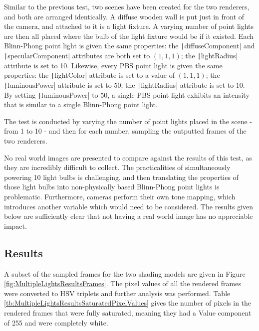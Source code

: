 Similar to the previous test, two scenes have been created for the two renderers, and both are arranged identically. A diffuse wooden wall is put just in front of the camera, and attached to it is a light fixture. A varying number of point lights are then all placed where the bulb of the light fixture would be if it existed. Each Blinn-Phong point light is given the same properties: the \texttt|diffuseComponent| and \texttt|specularComponent| attributes are both set to \begin{math}(1, 1, 1)\end{math}; the \texttt|lightRadius| attribute is set to 10. Likewise, every PBS point light is given the same properties: the \texttt|lightColor| attribute is set to a value of \begin{math}(1, 1, 1)\end{math}; the \texttt|luminousPower| attribute is set to 50; the \texttt|lightRadius| attribute is set to 10. By setting \texttt|luminousPower| to 50, a single PBS point light exhibits an intensity that is similar to a single Blinn-Phong point light.

The test is conducted by varying the number of point lights placed in the scene - from 1 to 10 - and then for each number, sampling the outputted frames of the two renderers.

No real world images are presented to compare against the results of this test, as they are incredibly difficult to collect. The practicalities of simultaneously powering 10 light bulbs is challenging, and then translating the properties of those light bulbs into non-physically based Blinn-Phong point lights is problematic. Furthermore, cameras perform their own tone mapping, which introduces another variable which would need to be considered. The results given below are sufficiently clear that not having a real world image has no appreciable impact.

\subsection{Results}

A subset of the sampled frames for the two shading models are given in Figure \ref{fig:MultipleLightsResultsFrames}. The pixel values of all the rendered frames were converted to HSV triplets and further analysis was performed. Table \ref{tb:MultipleLightsResultsSaturatedPixelValues} gives the number of pixels in the rendered frames that were fully saturated, meaning they had a Value component of 255 and were completely white.

